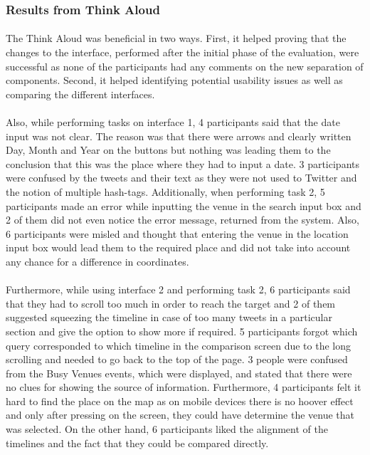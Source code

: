\documentclass{l4proj}
\begin{document}
\subsubsection{Results from Think Aloud}
\paragraph{}
The Think Aloud was beneficial in two ways. First, it helped proving that the changes to the interface, performed after the initial phase of the evaluation,  were successful as none of the participants had any comments on the new separation of components. Second, it helped identifying potential usability issues as well as comparing the different interfaces. 
\paragraph{}
Also, while performing tasks on interface 1, 4 participants said that the date input was not clear. The reason was that there were arrows and clearly written Day, Month and Year on the buttons but nothing was leading them to the conclusion that this was the place where they had to input a date. 3 participants were confused by the tweets and their text as they were not used to Twitter and the notion of multiple hash-tags. Additionally, when performing task 2, 5 participants made an error while inputting the venue in the search input box and 2 of them did not even notice the error message, returned from the system. Also, 6 participants were misled and thought that entering the venue in the location input box would lead them to the required place and did not take into account any chance for a difference in coordinates. 
\paragraph{}
Furthermore, while using interface 2 and performing task 2, 6 participants said that they had to scroll too much in order to reach the target and 2 of them suggested squeezing the timeline in case of too many tweets in a particular section and give the option to show more if required. 5 participants forgot which query corresponded to which timeline in the comparison screen due to the long scrolling and needed to go back to the top of the page. 3 people were confused from the Busy Venues events, which were displayed, and stated that there were no clues for showing the source of information. Furthermore, 4 participants felt it hard to find the place on the map as on mobile devices there is no hoover effect and only after pressing on the screen, they could have determine the venue that was selected. On the other hand, 6 participants liked the alignment of the timelines and the fact that they could be compared directly.
\end{document}
